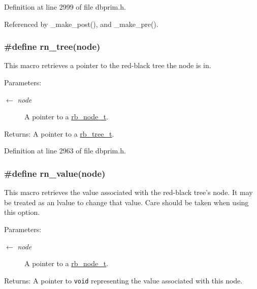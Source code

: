 Definition at line 2999 of file dbprim.h.

Referenced by \_\-make\_\-post(), and \_\-make\_\-pre().\hypertarget{group__dbprim__rbtree_ga33}{
\subsubsection[rn\_\-tree]{\setlength{\rightskip}{0pt plus 5cm}\#define rn\_\-tree(node)}}
\label{group__dbprim__rbtree_ga33}


This macro retrieves a pointer to the red-black tree the node is in.

\begin{Desc}
\item[Parameters:]
\begin{description}
\item[\mbox{$\leftarrow$} {\em node}]A pointer to a \hyperlink{group__dbprim__rbtree_ga1}{rb\_\-node\_\-t}.\end{description}
\end{Desc}
\begin{Desc}
\item[Returns:]A pointer to a \hyperlink{group__dbprim__rbtree_ga0}{rb\_\-tree\_\-t}.\end{Desc}


Definition at line 2963 of file dbprim.h.\hypertarget{group__dbprim__rbtree_ga38}{
\subsubsection[rn\_\-value]{\setlength{\rightskip}{0pt plus 5cm}\#define rn\_\-value(node)}}
\label{group__dbprim__rbtree_ga38}


This macro retrieves the value associated with the red-black tree's node. It may be treated as an lvalue to change that value. Care should be taken when using this option.

\begin{Desc}
\item[Parameters:]
\begin{description}
\item[\mbox{$\leftarrow$} {\em node}]A pointer to a \hyperlink{group__dbprim__rbtree_ga1}{rb\_\-node\_\-t}.\end{description}
\end{Desc}
\begin{Desc}
\item[Returns:]A pointer to {\tt void} representing the value associated with this node.\end{Desc}


